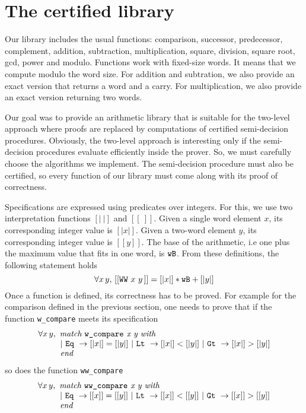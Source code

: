 \section{The certified library \label{Op}}
Our library includes the usual functions:
comparison, successor, predecessor, complement, addition, subtraction, 
multiplication, square, division, square root, gcd, power and modulo.
Functions work with fixed-size words. It means that we compute modulo
the word size. For addition and subtration, we also provide an exact version
that returns a word and a carry. For multiplication, we also provide an exact version
returning two words. 

Our goal was to provide an arithmetic library that is suitable for the two-level
approach where proofs are replaced by computations of certified semi-decision procedures.
Obviously, the two-level approach is interesting only if the semi-decision procedures evaluate
efficiently inside the prover.
So, we must carefully choose the algorithms we implement.
The semi-decision procedure must also be certified, so  every function of our library must come 
along with its proof of correctness. 

Specifications are expressed 
using predicates over integers. For this, we use two interpretation functions
{$ [|\ |]$} and {$[[\ ]]$}.
Given a single word element $x$, its corresponding integer value
is $[|x|]$. Given a two-word element $y$, its corresponding
integer value is $[[y]]$. The base of the arithmetic, i.e
one plus the maximum value that fits in one word, is ${\texttt{wB}}$. From these definitions, the 
following statement holds
$$\forall x\, y,\, [[\texttt{WW}\,\,x\,\,y\,]] = [|x|] * {\texttt{wB}} + [|y|]$$
Once a function is defined, its correctness has to be proved.
For example for the comparison defined in the previous section,
one needs to prove that if the function {\tt w\_compare} meets its specification
$$\begin{array}{l}
\forall x\, y, \,\, \textit{match {\tt w\_compare} x y with} \\
\qquad\,\,\,\,
 |\,\, \texttt{Eq}\,\, \rightarrow [|x|] = [|y|]\,\, | \,\,\texttt{Lt}\,\, \rightarrow [|x|] < [|y|] \,\,
| \,\,\texttt{Gt}\,\, \rightarrow [|x|] > [|y|]\\
\qquad\,\,\,\, \textit{end}
\end{array}
$$
so does the function {\tt ww\_compare}
$$\begin{array}{l}
\forall x\, y, \,\, \textit{match {\tt ww\_compare} x y with} \\
\qquad\,\,\,\,
 |\,\, \texttt{Eq}\,\, \rightarrow [[x]] = [[y]]\,\, | \,\,\texttt{Lt}\,\, \rightarrow [[x]] < [[y]] \,\,
| \,\,\texttt{Gt}\,\, \rightarrow [[x]] > [[y]]\\
\qquad\,\,\,\, \textit{end}
\end{array}
$$

